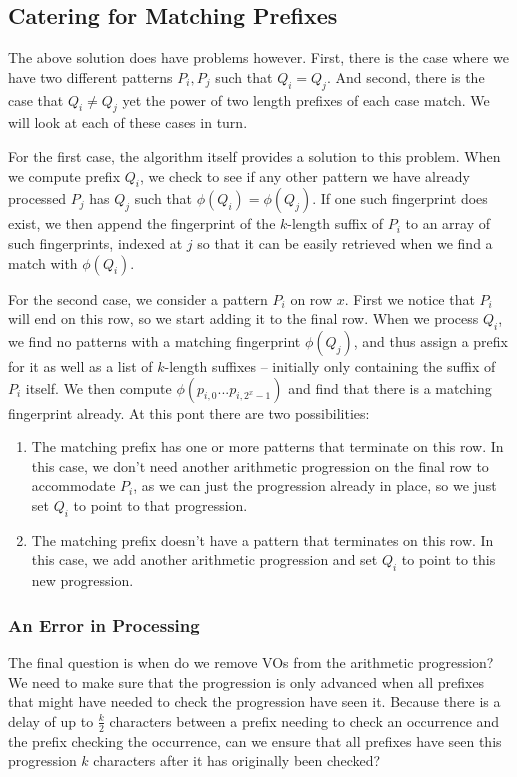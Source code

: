 \documentclass[ %
                    author={Dominic Joseph Moylett},
                    degree={MEng},
                     title={Dictionary Matching with Fingerprints},
                  subtitle={An Empirical Analysis},
                      type={research},
                      year={2015} ]{dissertation}
\begin{document}
\subsection{Catering for Matching Prefixes}

The above solution does have problems however. First, there is the case where we have two different patterns $P_i, P_j$ such that $Q_i = Q_j$. And second, there is the case that $Q_i \neq Q_j$ yet the power of two length prefixes of each case match. We will look at each of these cases in turn.

For the first case, the algorithm itself provides a solution to this problem. When we compute prefix $Q_i$, we check to see if any other pattern we have already processed $P_j$ has $Q_j$ such that $\phi(Q_i) = \phi(Q_j)$. If one such fingerprint does exist, we then append the fingerprint of the $k$-length suffix of $P_i$ to an array of such fingerprints, indexed at $j$ so that it can be easily retrieved when we find a match with $\phi(Q_i)$.

For the second case, we consider a pattern $P_i$ on row $x$. First we notice that $P_i$ will end on this row, so we start adding it to the final row. When we process $Q_i$, we find no patterns with a matching fingerprint $\phi(Q_j)$, and thus assign a prefix for it as well as a list of $k$-length suffixes -- initially only containing the suffix of $P_i$ itself. We then compute $\phi(p_{i,0}...p_{i,2^x-1})$ and find that there is a matching fingerprint already. At this pont there are two possibilities:

\begin{enumerate}
  \item The matching prefix has one or more patterns that terminate on this row. In this case, we don't need another arithmetic progression on the final row to accommodate $P_i$, as we can just the progression already in place, so we just set $Q_i$ to point to that progression.
  \item The matching prefix doesn't have a pattern that terminates on this row. In this case, we add another arithmetic progression and set $Q_i$ to point to this new progression.
\end{enumerate}

\subsubsection{An Error in Processing}

The final question is when do we remove VOs from the arithmetic progression? We need to make sure that the progression is only advanced when all prefixes that might have needed to check the progression have seen it. Because there is a delay of up to $\frac{k}{2}$ characters between a prefix needing to check an occurrence and the prefix checking the occurrence, can we ensure that all prefixes have seen this progression $k$ characters after it has originally been checked?
\end{document}
